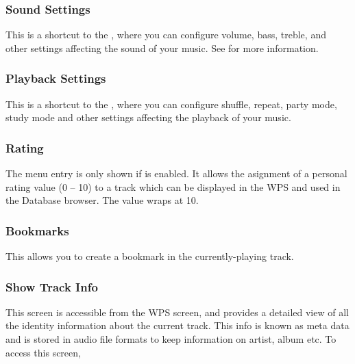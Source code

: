 \subsubsection{Sound Settings}
This is a shortcut to the , where you can configure volume,
bass, treble, and other settings affecting the sound of your music.  
See  for more information.

\subsubsection{Playback Settings}
This is a shortcut to the , where you can configure shuffle,
repeat, party mode, study mode and other settings affecting the playback of your music.  

\subsubsection{Rating}
The menu entry is only shown if  is
enabled. It allows the asignment of a personal rating value (0 -- 10)
to a track which can be displayed in the WPS and used in the Database
browser. The value wraps at 10.

\subsubsection{Bookmarks}
This allows you to create a bookmark in the currently-playing track.

\subsubsection{\label{ref:trackinfoviewer}Show Track Info}
This screen is accessible from the WPS screen, and provides a detailed view of
all the identity information about the current track. This info is known as
meta data and is stored in audio file formats to keep information on artist,
album etc.  To access this screen, %
%
%
%

